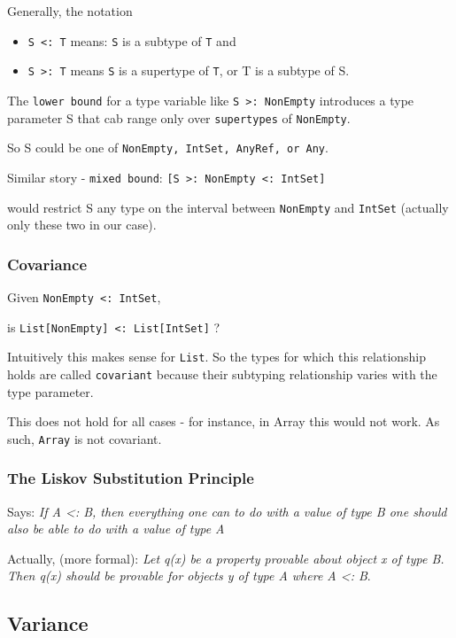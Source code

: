 \documentclass{scrartcl}
\newcommand{\term}[1]{\verb~#1~} %
\begin{document}
Generally, the notation
\begin{itemize}
\item \lstinline|S <: T| means: \lstinline|S| is a subtype of \lstinline|T| and
\item \lstinline|S >: T| means \lstinline|S| is a supertype of \lstinline|T|, or
  T is a subtype of S.
\end{itemize}

The \term{lower bound} for a type variable like \lstinline|S >: NonEmpty|
introduces a type parameter S that cab range only over \term{supertypes} of
\lstinline|NonEmpty|.

So S could be one of \lstinline|NonEmpty, IntSet, AnyRef, or Any|.

Similar story - \term{mixed bound}:
\lstinline|[S >: NonEmpty <: IntSet]|

would restrict S any type on the interval between \lstinline|NonEmpty| and
\lstinline|IntSet| (actually only these two in our case).

\subsubsection{Covariance}
\label{sec:Covariance}

Given \lstinline|NonEmpty <: IntSet|,

is \lstinline|List[NonEmpty] <: List[IntSet]| ?

Intuitively this makes sense for \lstinline|List|. So the types for which this
relationship holds are called \term{covariant} because their subtyping
relationship varies with the type parameter.

This does not hold for all cases - for instance, in Array this would not work.
As such, \lstinline|Array| is not covariant.

\subsubsection{The Liskov Substitution Principle}
\label{sec:Liskov}

Says: {\it If A <: B, then everything one can to do with a value of type B one
  should also be able to do with a value of type A}

Actually, (more formal): {\it Let q(x) be a property provable about object x of
  type B. Then q(x) should be provable for objects y of type A where A <: B}.

\subsection{Variance}
\label{sec:Variance}
\end{document}
